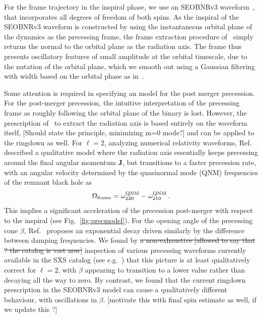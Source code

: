 \documentclass[aps,showpacs,twocolumn,
prd,superscriptaddress,nofootinbib]{revtex4-1}
\newcommand{\be}{\begin{equation}}
\newcommand{\ee}{\end{equation}}
\newcommand{\SM}[1]{{\color{Red} #1}}
\newcommand{\jgb}[1]{{\color{DarkGreen} #1}}
\begin{document}
For the frame trajectory in the inspiral phase, we use an SEOBNRv3 waveform~\cite{Pan+13, BTB16}, that incorporates all degrees of freedom of both spins. As the inspiral of the SEOBNRv3 waveform is constructed by using the instantaneous orbital plane of the dynamics as the precessing frame, the frame extraction procedure of~\cite{OShaughnessy+11} simply returns the normal to the orbital plane as the radiation axis. The frame thus presents oscillatory features of small amplitude at the orbital timescale, due to the nutation of the orbital plane, which we smooth out using a Gaussian filtering with width based on the orbital phase as in~\cite{Blackman+17a}.

\jgb{Some attention is required in specifying an model for the post merger precession.}
For the post-merger precession, the intuitive interpretation of the precessing frame as roughly following the orbital plane of the binary is lost. However, the prescription of~\cite{OShaughnessy+11} to extract the radiation axis is based entirely on the waveform itself,\jgb{ [Should state the principle, minimizing m=0 mode?]} and can be applied to the ringdown as well. For $\ell=2$, analyzing numerical relativity waveforms, Ref.~\cite{OShaughnessy+12} described a qualitative model where the radiation axis essentially keeps precessing around the final angular momentum $\bm{J}$, but transitions to a faster precession rate, with an angular velocity determined by the quasinormal mode (QNM) frequencies of the remnant black hole as
\be\label{eq:OmegaframeQNM}
	\Omega_{\rm frame} = \omega_{220}^{\rm QNM} - \omega_{210}^{\rm QNM} \,.
\ee
This \jgb{implies} a significant acceleration of the precession post-merger with respect to the inspiral (see Fig.~\ref{fig:precmodel}). For the opening angle of the precessing cone $\beta$, Ref.~\cite{OShaughnessy+12} proposes an exponential decay driven similarly by the difference between damping frequencies. We found by \sout{a non-exhaustive \SM{[allowed to say that ? the catalog is vast now]}} inspection of \jgb{various} precessing waveforms currently available in the SXS catalog (see e.g.~\cite{SXScatalog, Mroue+12, Mroue+13}) that this picture is at least qualitatively correct for $\ell=2$, with $\beta$ appearing to transition to a lower value rather than decaying all the way to zero. By contrast, we found that the current ringdown prescription in the SEOBNRv3 model can cause a qualitatively different behaviour, with oscillations in $\beta$. \SM{[motivate this with final spin estimate as well, if we update this ?]}
\end{document}
